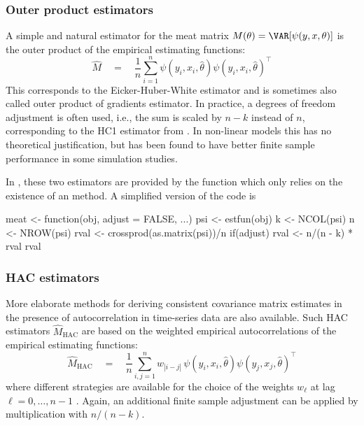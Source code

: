 \documentclass{Z}
\begin{document}
    
\subsubsection{Outer product estimators}

A simple and natural estimator for the meat matrix $M(\theta) = \VAR[ \psi(y, x, \theta)]$
is the outer product of the empirical estimating functions:
\begin{equation} \label{eq:meatOP}
  \hat M \quad = \quad \frac{1}{n} \sum_{i = 1}^n
    \psi(y_i, x_i, \hat \theta) \psi(y_i, x_i, \hat \theta)^\top
\end{equation}
This corresponds to the Eicker-Huber-White estimator \citep{hac:Eicker:1963,hac:Huber:1967,hac:White:1980}
and is sometimes also called outer product of gradients estimator. In practice, a degrees
of freedom adjustment is often used, i.e., the sum is scaled by $n-k$ instead of $n$,
corresponding to the HC1 estimator from \cite{hac:MacKinnon+White:1985}. In non-linear
models this has no theoretical justification, but has been found to have better finite sample
performance in some simulation studies.

In , these two estimators are provided by the function  which only
relies on the existence of an  method. A simplified version of the  code is
\begin{Schunk}
\begin{Sinput}
meat <- function(obj, adjust = FALSE, ...) 
{
  psi <- estfun(obj)
  k <- NCOL(psi)
  n <- NROW(psi)
  rval <- crossprod(as.matrix(psi))/n
  if(adjust) rval <- n/(n - k) * rval
  rval
}
\end{Sinput}
\end{Schunk}


\subsubsection{HAC estimators}

More elaborate methods for deriving consistent covariance matrix estimates in the
presence of autocorrelation in time-series data are also available. Such HAC estimators
$\hat M_\mathrm{HAC}$ are based on the weighted empirical autocorrelations of the empirical
estimating functions:
\begin{equation} \label{eq:meatHAC}
  \hat M_\mathrm{HAC} \quad = \quad \frac{1}{n}
  \sum_{i, j = 1}^n w_{|i-j|} \, \psi(y_i, x_i, \hat \theta) \psi(y_j, x_j, \hat \theta)^\top
\end{equation}
where different strategies are available for the choice of the weights $w_\ell$ at lag
$\ell = 0, \dots, {n-1}$ \citep{hac:Andrews:1991,hac:Newey+West:1994,hac:Lumley+Heagerty:1999}.
Again, an additional finite sample adjustment can be applied by multiplication with $n/(n-k)$.
\end{document}
